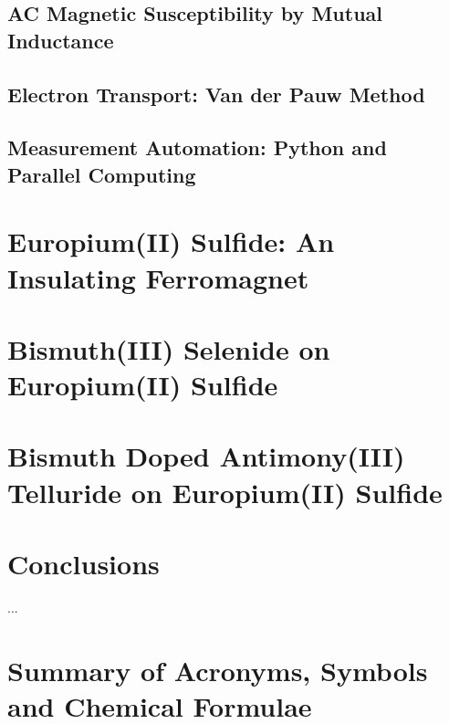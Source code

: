 \documentclass{report}
\begin{document}
    \section{AC Magnetic Susceptibility by Mutual Inductance}
    \section{Electron Transport: Van der Pauw Method}
    \section{Measurement Automation: Python and Parallel Computing}

\chapter{Europium(II) Sulfide: An Insulating Ferromagnet}
\label{ch:EuS}

\chapter{Bismuth(III) Selenide on Europium(II) Sulfide}
\label{ch:bilayer2014}


\chapter{Bismuth Doped Antimony(III) Telluride on Europium(II) Sulfide}
\label{ch:bilayer2018}

\chapter{Conclusions}
\label{ch:conclusions}
     ...
\appendix
\chapter{Summary of Acronyms, Symbols and Chemical Formulae}
    

\printbibliography
\end{document}
